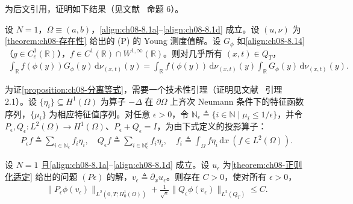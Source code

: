 \documentclass[../../main.tex]{subfiles}%
\begin{document}
为后文引用，证明如下结果（见文献~\cite{ref100} 命题 6）。

\begin{proposition}[测度分量的分离等式]\label{proposition:ch08-分离等式}
设 $N=1$，$\Omega\equiv(a,b)$，\eqref{align:ch08-8.1a}--\eqref{align:ch08-8.1d} 成立。设 $(u,\nu)$ 为\cref{theorem:ch08-存在性} 给出的 (P) 的 Young 测度值解。设 $G_\phi$ 如\eqref{align:ch08-8.14}（$g\in C^1_c(\mathbb{R})$），$f\in C^1(\mathbb{R})\cap W^{1,\infty}(\mathbb{R})$。则对几乎所有 $(x,t)\in Q_T$，
\begin{align}
\int_{\mathbb{R}}f(\phi(y))G_\phi(y)\,\mathrm{d}\nu_{(x,t)}(y)
=\int_{\mathbb{R}}f(\phi(y))\,\mathrm{d}\nu_{(x,t)}(y)\int_{\mathbb{R}}G_\phi(y)\,\mathrm{d}\nu_{(x,t)}(y). \label{align:ch08-8.58}
\end{align}
\end{proposition}

为证\cref{proposition:ch08-分离等式}，需要一个技术性引理（证明见文献~\cite{ref83} 引理 2.1）。设 $\{\eta_i\}\subseteq H^1(\Omega)$ 为算子 $-\Delta$ 在 $\partial\Omega$ 上齐次 Neumann 条件下的特征函数序列，$\{\mu_i\}$ 为相应特征值序列。对任意 $\epsilon>0$，令 $\mathbb{N}_\epsilon\triangleq \{i\in\mathbb{N}\mid\mu_i\leqslant1/\epsilon\}$，并令 $P_\epsilon,Q_\epsilon:L^2(\Omega)\to H^1(\Omega)$、$P_\epsilon+Q_\epsilon=I$，为由下式定义的投影算子：
\begin{align}
P_\epsilon f\triangleq \sum_{i\in\mathbb{N}_\epsilon}f_i\eta_i,\quad
Q_\epsilon f\triangleq \sum_{i\in\mathbb{N}_\epsilon^c}f_i\eta_i,\quad
f_i\triangleq \int_\Omega f\eta_i\,\mathrm{d}x\ (f\in L^2(\Omega)). \label{align:ch08-8.59}
\end{align}

\begin{lemma}[投影估计]\label{lemma:ch08-投影估计}
设 $N=1$ 且\eqref{align:ch08-8.1a}--\eqref{align:ch08-8.1d} 成立。设 $u_\epsilon$ 为\cref{theorem:ch08-正则化适定} 给出的问题 $(P\epsilon)$ 的解，$v_\epsilon\triangleq \partial_x u_\epsilon$。则存在 $C>0$，使对所有 $\epsilon>0$，
\begin{align}
\|P_\epsilon\phi(v_\epsilon)\|_{L^2(0,T;H^1_0(\Omega))}
+\frac{1}{\sqrt\epsilon}\|Q_\epsilon\phi(v_\epsilon)\|_{L^2(Q_T)}\leqslant C. \label{align:ch08-8.60}
\end{align}
\end{lemma}
\end{document}
